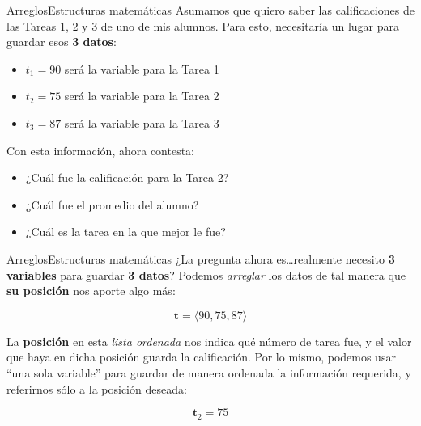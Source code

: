 \documentclass[spanish, c]{beamer}
\begin{document}
\begin{frame}{Arreglos}{Estructuras matemáticas}
    Asumamos que quiero saber las calificaciones de las Tareas 1, 2 y 3 de uno de mis alumnos.
    Para esto, necesitaría un lugar para guardar esos \textbf{3 datos}: \pause

    \bigskip

    \begin{itemize}[<+->]
        \item $t_1 = 90$ será la variable para la Tarea 1
        \item $t_2 = 75$ será la variable para la Tarea 2
        \item $t_3 = 87$ será la variable para la Tarea 3
    \end{itemize}

    \bigskip

    Con esta información, ahora contesta: \pause

    \begin{itemize}[<+->]
        \item ¿Cuál fue la calificación para la Tarea 2?
        \item ¿Cuál fue el promedio del alumno?
        \item ¿Cuál es la tarea en la que mejor le fue?
    \end{itemize}
\end{frame}

\begin{frame}{Arreglos}{Estructuras matemáticas}
    ¿La pregunta ahora es\dots realmente necesito \textbf{3 variables} para guardar \textbf{3 datos}?
    Podemos \textit{arreglar} los datos de tal manera que \textbf{su posición} nos aporte algo más: \pause

    $$\mathbf{t} = \langle 90, 75, 87 \rangle$$ \pause

    La \textbf{posición} en esta \textit{lista ordenada} nos indica qué número de tarea fue, y el valor que haya en dicha posición guarda la calificación. Por lo mismo, podemos usar ``una sola variable'' para guardar de manera ordenada la información requerida, y referirnos sólo a la posición deseada:

    $$\mathbf{t}_2 = 75$$
\end{frame}
\end{document}
